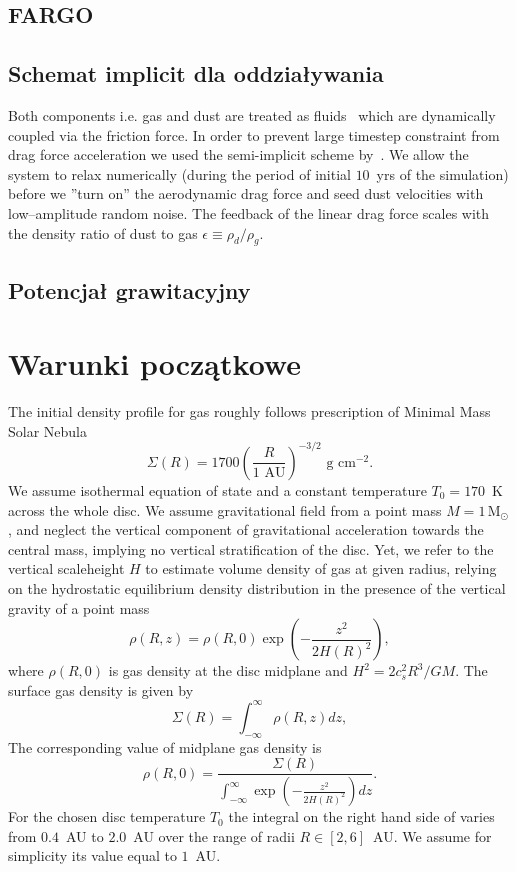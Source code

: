 \subsection{FARGO}

\subsection{Schemat implicit dla oddziaływania}
Both components i.e. gas and dust are treated as fluids~\citep{piernik2} which
are dynamically coupled via the friction force. In order to prevent large
timestep constraint from drag force acceleration we used the semi-implicit
scheme by~\cite{TB09}. We allow the system to relax numerically (during the
period of initial $10$~yrs of the simulation) before we ''turn on'' the
aerodynamic drag force and seed dust velocities with low--amplitude random
noise. The feedback of the linear drag force scales with the density ratio of
dust to gas $\epsilon\equiv \rho_d/\rho_g$.

\subsection{Potencjał grawitacyjny}
\section{Warunki początkowe}
The initial density profile for gas roughly follows prescription of Minimal Mass
Solar Nebula~\citep{H81}
\begin{equation}
   \Sigma(R) = 1700 \left(\frac{R}{1\textrm{ AU}}\right)^{-3/2} 
   \textrm{ g cm}^{-2}.
\end{equation}
We assume isothermal equation of state and a constant temperature $T_0 = 170$~K
across the whole disc. 
We assume gravitational field from a point mass $M=1\,\textrm{M}_\odot$, and
neglect the vertical component of gravitational acceleration towards the central
mass, implying no vertical stratification of the disc. Yet, we refer to the
vertical scaleheight $H$ to estimate  volume density of gas at given radius,
relying on the hydrostatic equilibrium density distribution in the presence of
the vertical gravity of a point mass
%
\begin{equation}
   \rho(R,z) =  \rho(R,0) \exp\left(-\frac{z^2}{2H(R)^2}\right),
\end{equation}
where $\rho(R,0)$ is gas density at the disc midplane and $H^2 = 2 c_s^2 R^3/
GM$.
%
The surface gas density is given by
\begin{equation}
   \Sigma(R) = \int_{-\infty}^\infty \rho(R,z) dz,
\end{equation}
%
The corresponding value of midplane gas density is
\begin{equation}
   \label{eq:rho}
    \rho(R,0) = \frac{\Sigma(R) }{\int_{-\infty}^\infty
   \exp\left(-\frac{z^2}{2H(R)^2}\right) dz}.
\end{equation}
For the chosen disc temperature $T_0$ the integral on the right hand side of
 varies from $0.4$~AU to $2.0$~AU over the range of radii $R\in
[2,6]$~AU. 
We assume for simplicity its value equal to $1$~AU. 

